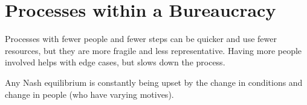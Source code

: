 \section{Processes within a Bureaucracy}

Processes with fewer people and fewer steps can be quicker and use fewer resources, but they are more fragile and less representative. Having more people involved helps with edge cases, but slows down the process. 

Any Nash equilibrium is constantly being upset by the change in conditions and change in people (who have varying motives).